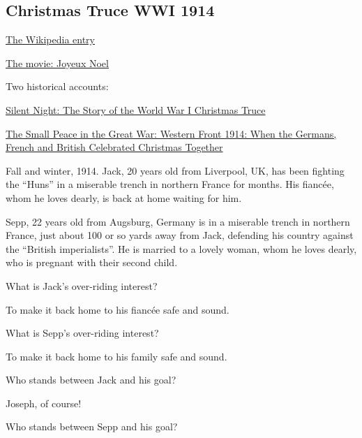 \documentclass[
]{book}
\begin{document}
\hypertarget{christmas-truce-wwi-1914}{%
\subsection{Christmas Truce WWI 1914}\label{christmas-truce-wwi-1914}}

\href{https://en.wikipedia.org/wiki/Christmas_truce}{The Wikipedia entry}

\href{https://en.wikipedia.org/wiki/Joyeux_No\%C3\%ABl}{The movie: Joyeux Noel}

Two historical accounts:

\href{https://www.amazon.com/Silent-Night-Story-World-Christmas/dp/0452283671}{Silent Night: The Story of the World War I Christmas Truce}

\href{https://www.amazon.de/kleine-Frieden-Gro\%C3\%9Fen-Krieg-Weihnachten/dp/3570007456}{The Small Peace in the Great War: Western Front 1914: When the Germans, French and British Celebrated Christmas Together}

Fall and winter, 1914. Jack, 20 years old from Liverpool, UK, has been fighting the ``Huns'' in a miserable trench in northern France for months. His fiancée, whom he loves dearly, is back at home waiting for him.

Sepp, 22 years old from Augsburg, Germany is in a miserable trench in northern France, just about 100 or so yards away from Jack, defending his country against the ``British imperialists''. He is married to a lovely woman, whom he loves dearly, who is pregnant with their second child.

What is Jack's over-riding interest?

\begin{center}
To make it back home to his fiancée safe and sound.

\end{center}

What is Sepp's over-riding interest?

\begin{center}
To make it back home to his family safe and sound.

\end{center}

Who stands between Jack and his goal?

\begin{center}
Joseph, of course!

\end{center}

Who stands between Sepp and his goal?
\end{document}

